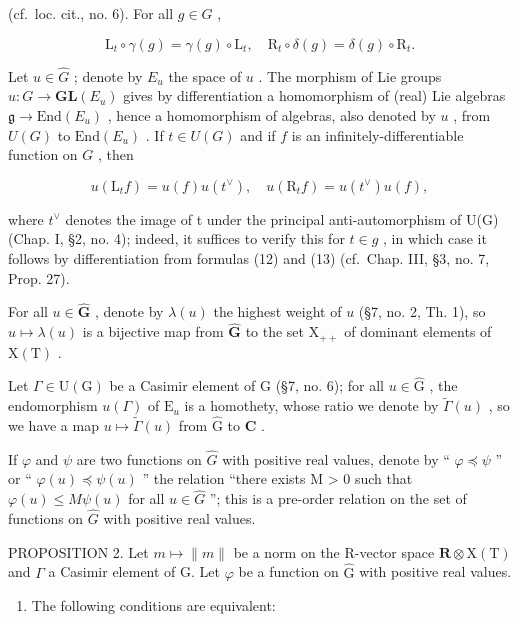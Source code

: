 (cf.~loc. cit., no. 6). For all \(g \in G\) ,

\[
\mathrm{L} _ {t} \circ \gamma (g) = \gamma (g) \circ \mathrm{L} _ {t}, \quad \mathrm{R} _ {t} \circ \delta (g) = \delta (g) \circ \mathrm{R} _ {t}.
\]

Let \(u \in \hat{G}\) ; denote by \(E_u\) the space of \(u\) . The morphism of Lie groups \(u: G \to \mathbf{GL}(E_u)\) gives by differentiation a homomorphism of (real) Lie algebras \(\mathfrak{g} \to \text{End}(E_u)\) , hence a homomorphism of algebras, also denoted by \(u\) , from \(U(G)\) to \(\text{End}(E_u)\) . If \(t \in U(G)\) and if \(f\) is an infinitely-differentiable function on \(G\) , then

\[
u (\mathrm{L} _ {t} f) = u (f) u (t ^ {\vee}), \quad u (\mathrm{R} _ {t} f) = u (t ^ {\vee}) u (f),\tag{14}
\]

where \(t^{\vee}\) denotes the image of t under the principal anti-automorphism of U(G) (Chap. I, §2, no. 4); indeed, it suffices to verify this for \(t \in g\) , in which case it follows by differentiation from formulas (12) and (13) (cf.~Chap. III, §3, no. 7, Prop. 27).

For all \(u \in \hat{\mathbf{G}}\) , denote by \(\lambda(u)\) the highest weight of \(u\) (§7, no. 2, Th. 1), so \(u \mapsto \lambda(u)\) is a bijective map from \(\hat{\mathbf{G}}\) to the set \(\mathrm{X}_{++}\) of dominant elements of \(\mathrm{X}(\mathrm{T})\) .

Let \(\Gamma \in \mathrm{U}(\mathrm{G})\) be a Casimir element of \(\mathrm{G}\) (§7, no. 6); for all \(u \in \hat{\mathrm{G}}\) , the endomorphism \(u(\Gamma)\) of \(\mathrm{E}_u\) is a homothety, whose ratio we denote by \(\tilde{\Gamma}(u)\) , so we have a map \(u \mapsto \tilde{\Gamma}(u)\) from \(\hat{\mathrm{G}}\) to \(\mathbf{C}\) .

If \(\varphi\) and \(\psi\) are two functions on \(\hat{G}\) with positive real values, denote by `` \(\varphi \preccurlyeq \psi\) '' or `` \(\varphi(u) \preccurlyeq \psi(u)\) '' the relation ``there exists M \textgreater{} 0 such that \(\varphi(u) \leq M\psi(u)\) for all \(u \in \hat{G}\) ''; this is a pre-order relation on the set of functions on \(\hat{G}\) with positive real values.

PROPOSITION 2. Let \(m \mapsto \|m\|\) be a norm on the R-vector space \(\mathbf{R} \otimes \mathrm{X(T)}\) and \(\Gamma\) a Casimir element of G. Let \(\varphi\) be a function on \(\hat{\mathrm{G}}\) with positive real values.

\begin{enumerate}
\def\labelenumi{\alph{enumi})}
\tightlist
\item
  The following conditions are equivalent:
\end{enumerate}


